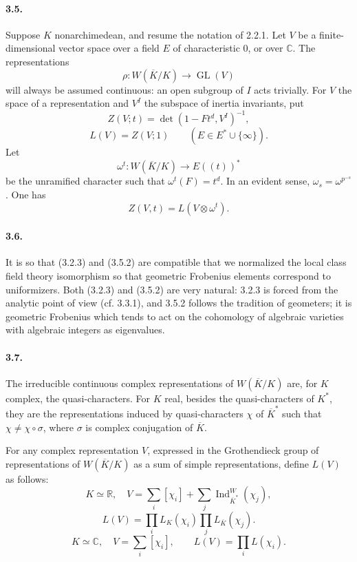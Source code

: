 \documentclass[10pt]{article}
\newcommand{\C}{\mathbb C}
\newcommand{\GL}{\operatorname{GL}}
\newcommand{\Ind}{\operatorname{Ind}}
\providecommand{\R}{\mathbb R}
\providecommand{\GL}{\operatorname{GL}}
\providecommand{\GL}{\operatorname{GL}}
\providecommand{\Ind}{\operatorname{Ind}}
\begin{document}
\paragraph{3.5.} Suppose \(K\) nonarchimedean, and resume the notation of 2.2.1. Let \(V\) be a finite-dimensional vector space over a field \(E\) of characteristic \(0\), or over \(\C\). The representations
\[
\rho:W(\overline K/K)\longrightarrow\GL(V)
\]
will always be assumed continuous: an open subgroup of \(I\) acts trivially. For \(V\) the space of a representation and \(V^I\) the subspace of inertia invariants, put
\[
\tag{3.5.1}
Z(V;t)=\det(1-Ft^d,V^I)^{-1},
\]
\[
\tag{3.5.2}
L(V)=Z(V;1)\qquad(E\in E^*\cup\{\infty\}).
\]
Let
\[
\omega^t:W(\overline K/K)\longrightarrow E((t))^*
\]
be the unramified character such that \(\omega^t(F)=t^d\). In an evident sense, \(\omega_s=\omega^{p^{-s}}\). One has
\[
\tag{3.5.3}
Z(V,t)=L(V\otimes\omega^t).
\]

\paragraph{3.6.} It is so that (3.2.3) and (3.5.2) are compatible that we normalized the local class field theory isomorphism so that geometric Frobenius elements correspond to uniformizers. Both (3.2.3) and (3.5.2) are very natural: 3.2.3 is forced from the analytic point of view (cf. 3.3.1), and 3.5.2 follows the tradition of geometers; it is geometric Frobenius which tends to act on the cohomology of algebraic varieties with algebraic integers as eigenvalues.

\paragraph{3.7.} The irreducible continuous complex representations of \(W(\overline K/K)\) are, for \(K\) complex, the quasi-characters. For \(K\) real, besides the quasi-characters of \(K^*\), they are the representations induced by quasi-characters \(\chi\) of \(\overline K^*\) such that \(\chi\ne\chi\circ\sigma\), where \(\sigma\) is complex conjugation of \(\overline K\).

For any complex representation \(V\), expressed in the Grothendieck group of representations of \(W(\overline K/K)\) as a sum of simple representations, define \(L(V)\) as follows:
\[
\tag{3.7.1}
K\simeq\R,\quad
V=\sum_i[\chi_i]+\sum_j\Ind_{\overline K^*}^{W}(\chi_j),
\]
\[
L(V)=\prod_i L_K(\chi_i)\prod_j L_{\overline K}(\chi_j).
\]
\[
\tag{3.7.2}
K\simeq\C,\quad V=\sum_i[\chi_i],
\qquad
L(V)=\prod_iL(\chi_i).
\]
\end{document}
